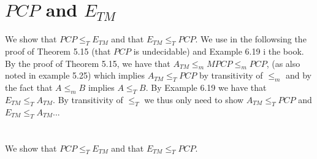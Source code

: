 \documentclass[a4paper,11pt]{article}
\numberwithin{equation}{section}
\begin{document}
\section*{$ PCP $ and $ E_{TM} $}
We show that $ PCP\leq_T E_{TM} $ and that $ E_{TM}\leq_T PCP$. We use in the followsing the proof of Theorem 5.15 (that $ PCP $ is undecidable) and Example 6.19 i the book. By the proof of Theorem 5.15, we have that $ A_{TM}\leq_m MPCP\leq_m PCP $, (as also noted in example 5.25) which implies $ A_{TM}\leq_T PCP $ by transitivity of $ \leq_m $ and by the fact that $ A\leq_m B $ implies $ A\leq_T B $. By Example 6.19 we have that $ E_{TM}\leq_T A_{TM} $. By transitivity of $ \leq_T $ we thus only need to show $ A_{TM}\leq_T PCP $ and $ E_{TM}\leq_T A_{TM} $...\\
\\
\\
We show that $ PCP\leq_T E_{TM} $ and that $ E_{TM}\leq_T PCP$.
\end{document}
